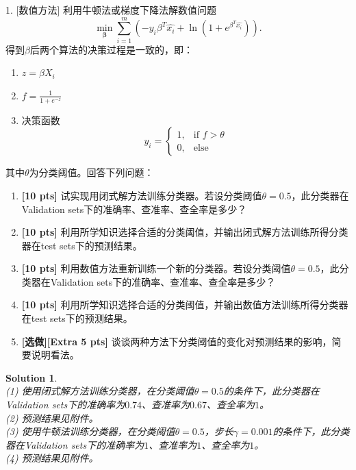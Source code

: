 \documentclass[a4paper,UTF8]{article}
\numberwithin{equation}{section}
\newtheorem*{solution}{Solution}
\begin{document}
\par 1. [数值方法] 利用牛顿法或梯度下降法解数值问题
\begin{equation}
	\min_{\mathbf{\beta}} \sum_{i=1}^{m}(-y_i\beta^T\hat{x_i}+\ln (1+e^{\beta^T\hat{x_i}})). 
\end{equation}
得到$\beta$后两个算法的决策过程是一致的，即：
\begin{enumerate}[(1)]
	\item $z=\beta X_{i}$
	\item $f=\frac{1}{1+e^{-z}}$
	\item 决策函数\begin{equation}
		y_{i}=
		\begin{cases}
		1,&\mbox{if $f>\theta$}\\
		0,&\mbox{else}
		\end{cases}
		\end{equation}
	\end{enumerate}
	其中$\theta$为分类阈值。回答下列问题：
	\begin{enumerate}[(1)]
		\item \textbf{[10 pts]} 试实现用闭式解方法训练分类器。若设分类阈值$\theta=0.5$，此分类器在Validation sets下的准确率、查准率、查全率是多少？
		\item \textbf{[10 pts]} 利用所学知识选择合适的分类阈值，并输出闭式解方法训练所得分类器在test sets下的预测结果。
		\item \textbf{[10 pts]} 利用数值方法重新训练一个新的分类器。若设分类阈值$\theta=0.5$，此分类器在Validation sets下的准确率、查准率、查全率是多少？
		\item \textbf{[10 pts]} 利用所学知识选择合适的分类阈值，并输出数值方法训练所得分类器在test sets下的预测结果。
		\item \textbf{[选做][Extra 5 pts]} 谈谈两种方法下分类阈值的变化对预测结果的影响，简要说明看法。
	\end{enumerate}
\begin{solution}
~\\\textsc{(1)} 使用闭式解方法训练分类器，在分类阈值$\theta=0.5$的条件下，此分类器在Validation sets下的准确率为$0.74$、查准率为$0.67$、查全率为$1$。 
~\\\textsc{(2)} 预测结果见附件。
~\\\textsc{(3)} 使用牛顿法训练分类器，在分类阈值$\theta=0.5$，步长$\gamma = 0.001$的条件下，此分类器在Validation sets下的准确率为$1$、查准率为$1$、查全率为$1$。
~\\\textsc{(4)} 预测结果见附件。
\end{solution}
\end{document}
